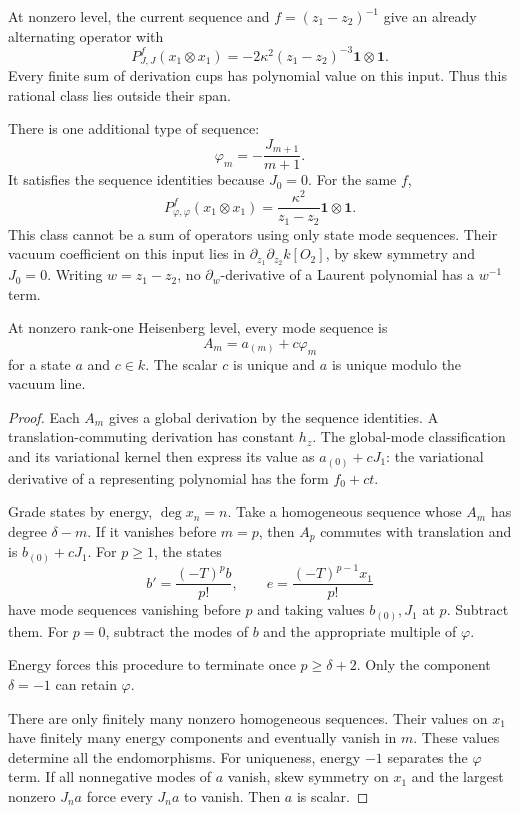 At nonzero level, the
current sequence and
$f=(z_1-z_2)^{-1}$
give an already
alternating operator
with
\[
 P^f_{J,J}(x_1\otimes x_1)
 =-2\kappa^2(z_1-z_2)^{-3}
       \mathbf1\otimes\mathbf1.
\]
Every finite sum of
derivation cups has
polynomial value on
this input. Thus
this rational class
lies outside their
span.

There is one additional
type of sequence:
\[
 \varphi_m=-\frac{J_{m+1}}{m+1}.
\]
It satisfies the
sequence identities
because $J_0=0$.
For the same $f$,
\[
 P^f_{\varphi,\varphi}(x_1\otimes x_1)
 =\frac{\kappa^2}{z_1-z_2}
       \mathbf1\otimes\mathbf1.
\]
This class cannot be
a sum of operators
using only state
mode sequences.
Their vacuum coefficient
on this input lies in
$\partial_{z_1}\partial_{z_2}k[O_2]$,
by skew symmetry and
$J_0=0$.
Writing $w=z_1-z_2$,
no $\partial_w$-derivative
of a Laurent polynomial
has a $w^{-1}$ term.

\begin{proposition}\label{v4-arith:centers:prop:sequences}
At nonzero rank-one
Heisenberg level, every
mode sequence is
\[
 A_m=a_{(m)}+c\varphi_m
\]
for a state $a$ and
$c\in k$. The scalar
$c$ is unique and
$a$ is unique modulo
the vacuum line.
\end{proposition}

\begin{proof}
Each $A_m$ gives a
global derivation by
the sequence identities.
A translation-commuting
derivation has constant
$h_z$.
The global-mode
classification and
its variational kernel
then express its
value as $a_{(0)}+cJ_1$:
the variational derivative
of a representing
polynomial has the
form $f_0+ct$.

Grade states by energy,
$\deg x_n=n$.
Take a homogeneous
sequence whose $A_m$
has degree $\delta-m$.
If it vanishes before
$m=p$, then $A_p$
commutes with translation
and is $b_{(0)}+cJ_1$.
For $p\geq1$, the states
\[
 b'=\frac{(-T)^pb}{p!},
 \qquad e=\frac{(-T)^{p-1}x_1}{p!}
\]
have mode sequences
vanishing before $p$
and taking values
$b_{(0)},J_1$ at $p$.
Subtract them.
For $p=0$, subtract
the modes of $b$
and the appropriate
multiple of $\varphi$.

Energy forces this
procedure to terminate
once $p\geq\delta+2$.
Only the component
$\delta=-1$ can retain
$\varphi$.

There are only finitely many nonzero homogeneous sequences.
Their values on $x_1$ have finitely many energy components
and eventually vanish in $m$. These values determine all
the endomorphisms.
For uniqueness, energy
$-1$ separates the
$\varphi$ term.
If all nonnegative
modes of $a$ vanish,
skew symmetry on
$x_1$ and the largest
nonzero $J_na$ force
every $J_na$ to vanish.
Then $a$ is scalar.
\end{proof}

